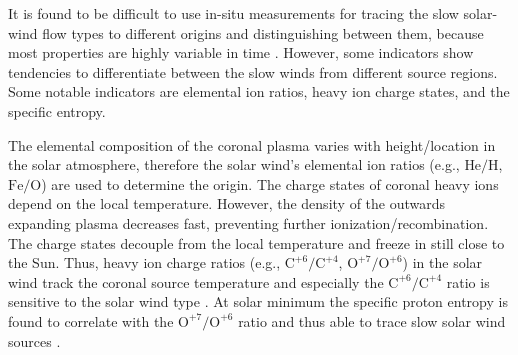 It is found to be difficult to use in-situ measurements for tracing the slow solar-wind flow types to different origins and distinguishing between them, because most properties are highly variable in time \citep{Kilpua2016}. However, some indicators show tendencies to differentiate between the slow winds from different source regions. Some notable indicators are elemental ion ratios, heavy ion charge states, and the specific entropy.

The elemental composition of the coronal plasma varies with height/location in the solar atmosphere, therefore the solar wind's elemental ion ratios (e.g., $\text{He}/\text{H}$, $\text{Fe}/\text{O}$) are used to determine the origin.
The charge states of coronal heavy ions depend on the local temperature. However, the density of the outwards expanding plasma decreases fast, preventing further ionization/recombination. The charge states decouple from the local temperature and freeze in still close to the Sun. Thus, heavy ion charge ratios (e.g., $\text{C}^{+6}\!/\text{C}^{+4}$, $\text{O}^{+7}\!/\text{O}^{+6}$) in the solar wind track the coronal source temperature and especially the $\text{C}^{+6}\!/\text{C}^{+4}$ ratio is sensitive to the solar wind type \citep{Landi2012}.
At solar minimum the specific proton entropy is found to correlate with the $\text{O}^{+7}\!/\text{O}^{+6}$ ratio and thus able to trace slow solar wind sources \citep{Pagel2004}.\\

